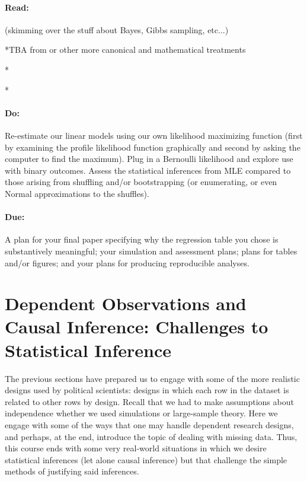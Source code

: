 \documentclass[10pt]{article}
\begin{document}
\subsection{Read:}
\citealp[Chap 9.3.3]{fox2008applied} 

\citealp[Chap 18.1--18.3]{gelman2007dau} (skimming over the stuff
about Bayes, Gibbs sampling, etc...)

*TBA from \citet{rice2007msd} or other more canonical and mathematical
treatments

*\citealp[Chap 4]{king89}

*\citealp[Chap 1,2]{Cox:2006}


\subsection{Do:} Re-estimate our linear models using our own
likelihood maximizing function (first by examining the profile
likelihood function graphically and second by asking the computer to
find the maximum). Plug in a Bernoulli likelihood and
explore use with binary outcomes. Assess the statistical inferences
from MLE compared to those arising from shuffling and/or bootstrapping
(or enumerating, or even Normal approximations to the shuffles). 




\subsection{Due:} A plan for your final paper specifying why the
regression table you chose is substantively meaningful; your
simulation and assessment plans; plans for tables and/or figures; and
your plans for producing reproducible analyses.

\part{Dependent Observations and Causal Inference: Challenges to Statistical Inference} %

The previous sections have prepared us to engage with some of the more
realistic designs used by political scientists: designs in which each
row in the dataset is related to other rows by design. Recall that we
had to make assumptions about independence whether we used simulations
or large-sample theory. Here we engage with some of the ways that one may
handle dependent research designs, and perhaps, at the end, introduce
the topic of dealing with missing data. Thus, this course ends with
some very real-world situations in which we desire statistical
inferences (let alone causal inference) but that challenge the simple
methods of justifying said inferences.
\end{document}
